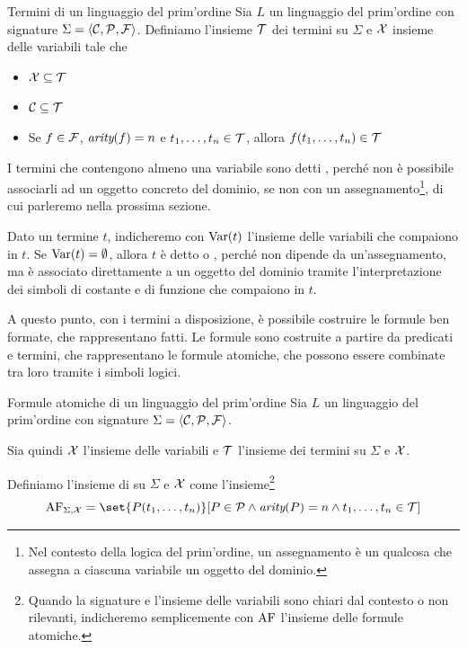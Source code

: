 \begin{definition}{Termini di un linguaggio del prim'ordine}
  Sia \(L\) un linguaggio del prim'ordine con signature \(\Sigma = \langle \mathcal{C}, \mathcal{P}, \mathcal{F} \rangle\). Definiamo l'insieme \(\mathcal{T}\) dei termini su \(\Sigma\) e \(\mathcal{X}\) insieme delle variabili tale che
  \begin{itemize}
    \item \(\mathcal{X}\subseteq \mathcal{T}\)
    \item \(\mathcal{C}\subseteq \mathcal{T}\)
    \item Se \(f\in\mathcal{F}\), \(\operatorname{\textit{arity}}(f)=n\) e \(t_1,\dots,t_n\in \mathcal{T}\), allora \(f(t_1,\dots,t_n)\in \mathcal{T}\)
  \end{itemize}

  I termini che contengono almeno una variabile sono detti , perché non è possibile associarli ad un oggetto concreto del dominio, se non con un assegnamento\footnote{Nel contesto della logica del prim'ordine, un assegnamento è un qualcosa che assegna a ciascuna variabile un oggetto del dominio.}, di cui parleremo nella prossima sezione.

  Dato un termine \(t\), indicheremo con \(\operatorname{Var}(t)\) l'insieme delle variabili che compaiono in \(t\). Se \(\operatorname{Var}(t)=\emptyset\), allora \(t\) è detto  o , perché non dipende da un'assegnamento, ma è associato direttamente a un oggetto del dominio tramite l'interpretazione dei simboli di costante e di funzione che compaiono in \(t\).
\end{definition}

A questo punto, con i termini a disposizione, è possibile costruire le formule ben formate, che rappresentano fatti. Le formule sono costruite a partire da predicati e termini, che rappresentano le formule atomiche, che possono essere combinate tra loro tramite i simboli logici.

\begin{definition}{Formule atomiche di un linguaggio del prim'ordine}
  Sia \(L\) un linguaggio del prim'ordine con signature \(\Sigma = \langle \mathcal{C}, \mathcal{P}, \mathcal{F} \rangle\).
  
  Sia quindi \(\mathcal{X}\) l'insieme delle variabili e \(\mathcal{T}\) l'insieme dei termini su \(\Sigma\) e \(\mathcal{X}\).

  Definiamo l'insieme di  su \(\Sigma\) e \(\mathcal{X}\) come l'insieme\footnote{Quando la signature e l'insieme delle variabili sono chiari dal contesto o non rilevanti, indicheremo semplicemente con \(\AF\) l'insieme delle formule atomiche.}
  \[\AF[\Sigma,\VarSyms] = \set{P(t_1,\dots,t_n)}[ P\in\PredSyms\land \arty(P)=n\land t_1,\dots,t_n\in \Terms]\]

\end{definition}

